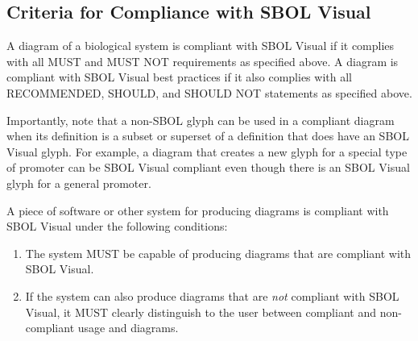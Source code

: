 \subsection{Criteria for Compliance with SBOL Visual}

A diagram of a biological system is compliant with SBOL Visual if it complies with all MUST and MUST NOT requirements as specified above.
A diagram is compliant with SBOL Visual best practices if it also complies with all RECOMMENDED, SHOULD, and SHOULD NOT statements as specified above.

Importantly, note that a non-SBOL glyph can be used in a compliant
diagram when its definition is a subset or superset of a definition that
does have an SBOL Visual glyph.  For example, a diagram that creates a
new glyph for a special type of promoter can be SBOL Visual compliant
even though there is an SBOL Visual glyph for a general promoter.

A piece of software or other system for producing diagrams is
compliant with SBOL Visual under the following conditions:
\begin{enumerate}
\item The system MUST be capable of producing diagrams that are
  compliant with SBOL Visual.
\item If the system can also produce diagrams that are {\em not}
  compliant with SBOL Visual, it MUST clearly distinguish to the user
  between compliant and non-compliant usage and diagrams.
\end{enumerate}

